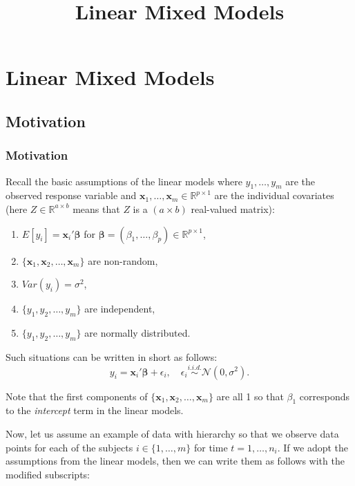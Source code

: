 \documentclass[ignorenonframetext,]{beamer}
\title{Linear Mixed Models}
\begin{document}
\frame{\titlepage}

\section{Linear Mixed Models}

\subsection{Motivation}

\begin{frame}[allowframebreaks]
\frametitle{Motivation}

Recall the basic assumptions of the linear models where $y_1,\ldots,y_m$ are the observed response variable and $\mathbf{x}_1,\ldots, \mathbf{x}_m \in \mathbb{R}^{p \times 1}$ are the individual covariates  (here $Z \in \mathbb{R}^{a \times b}$ means that $Z$ is a $(a \times b)$ real-valued matrix):
\begin{enumerate}
	\item $E[y_i] = \mathbf{x}_i' \bm{\beta}$ for $\bm{\beta} = (\beta_1, \ldots, \beta_p) \in \mathbb{R}^{p\times 1}$,
	\item $ \{\mathbf{x}_1, \mathbf{x}_2, \ldots, \mathbf{x}_m \}$ are non-random,
	\item $Var(y_i) = \sigma^2$,
	\item $\{ y_1, y_2, \ldots, y_m  \}$ are independent,
	\item $\{ y_1, y_2, \ldots, y_m  \}$ are normally distributed.
\end{enumerate}
Such situations can be written in short as follows:
\begin{equation} \label{eq:linmod}
y_i = \mathbf{x}_i' \bm{\beta}  + \epsilon_i, \quad \epsilon_i \overset{i.i.d.}\sim \mathcal{N}(0, \sigma^2).
\end{equation}

Note that the first components of $ \{\mathbf{x}_1, \mathbf{x}_2, \ldots, \mathbf{x}_m \}$ are all 1 so that $\beta_1$ corresponds to the \emph{intercept} term in the linear models.
\framebreak

Now, let us assume an example of data with hierarchy so that we observe data points for each of the subjects $i \in \{1,\ldots, m\}$ for time $t=1,\ldots, n_i$. If we adopt the assumptions from the linear models, then we can write them as follows with the modified subscripts:


\end{frame}
\end{document}
